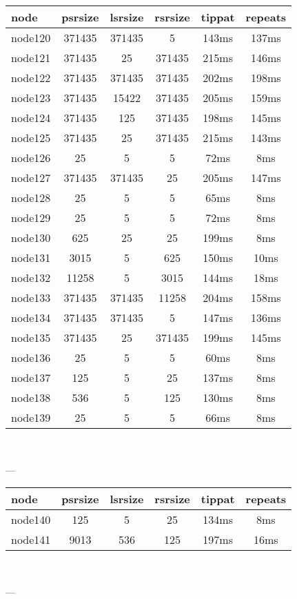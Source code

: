 \begin{tabular}{|l|c|c|c|c|c|}
\hline node & psrsize & lsrsize & rsrsize   & tippat & repeats\\
    \hline node120 & 371435 & 371435 & 5 & 143ms & 137ms\\
    \hline node121 & 371435 & 25 & 371435 & 215ms & 146ms\\
    \hline node122 & 371435 & 371435 & 371435 & 202ms & 198ms\\
    \hline node123 & 371435 & 15422 & 371435 & 205ms & 159ms\\
    \hline node124 & 371435 & 125 & 371435 & 198ms & 145ms\\
    \hline node125 & 371435 & 25 & 371435 & 215ms & 143ms\\
    \hline node126 & 25 & 5 & 5 & 72ms & 8ms\\
    \hline node127 & 371435 & 371435 & 25 & 205ms & 147ms\\
    \hline node128 & 25 & 5 & 5 & 65ms & 8ms\\
    \hline node129 & 25 & 5 & 5 & 72ms & 8ms\\
    \hline node130 & 625 & 25 & 25 & 199ms & 8ms\\
    \hline node131 & 3015 & 5 & 625 & 150ms & 10ms\\
    \hline node132 & 11258 & 5 & 3015 & 144ms & 18ms\\
    \hline node133 & 371435 & 371435 & 11258 & 204ms & 158ms\\
    \hline node134 & 371435 & 371435 & 5 & 147ms & 136ms\\
    \hline node135 & 371435 & 25 & 371435 & 199ms & 145ms\\
    \hline node136 & 25 & 5 & 5 & 60ms & 8ms\\
    \hline node137 & 125 & 5 & 25 & 137ms & 8ms\\
    \hline node138 & 536 & 5 & 125 & 130ms & 8ms\\
    \hline node139 & 25 & 5 & 5 & 66ms & 8ms\\

\hline
\end{tabular} \

---


\begin{tabular}{|l|c|c|c|c|c|}
\hline node & psrsize & lsrsize & rsrsize   & tippat & repeats\\
    \hline node140 & 125 & 5 & 25 & 134ms & 8ms\\
    \hline node141 & 9013 & 536 & 125 & 197ms & 16ms\\

\hline
\end{tabular} \

---

